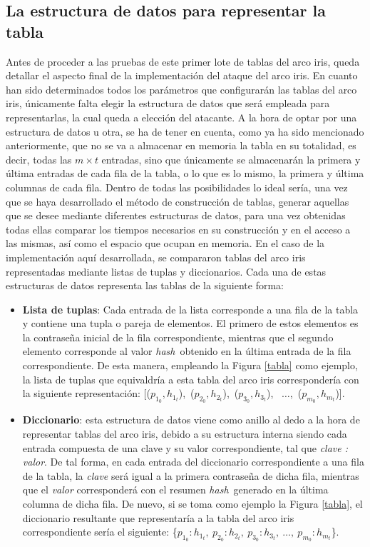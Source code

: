 \documentclass[12pt,spanish,listoffigures,listoftables,listofalgorithms]{tfgetsinf}
\newcommand{\hash}{\textit{hash}}
\begin{document}
\subsection{La estructura de datos para representar la tabla}

Antes de proceder a las pruebas de este primer lote de tablas del arco iris, queda detallar el aspecto final de la implementación del ataque del arco iris. En cuanto han sido determinados todos los parámetros que configurarán las tablas del arco iris, únicamente falta elegir la estructura de datos que será empleada para representarlas, la cual queda a elección del atacante. A la hora de optar por una estructura de datos u otra, se ha de tener en cuenta, como ya ha sido mencionado anteriormente, que no se va a almacenar en memoria la tabla en su totalidad, es decir, todas las $m \times t$ entradas, sino que únicamente se almacenarán la primera y última entradas de cada fila de la tabla, o lo que es lo mismo, la primera y última columnas de cada fila. Dentro de todas las posibilidades lo ideal sería, una vez que se haya desarrollado el método de construcción de tablas, generar aquellas que se desee mediante diferentes estructuras de datos, para una vez obtenidas todas ellas comparar los tiempos necesarios en su construcción y en el acceso a las mismas, así como el espacio que ocupan en memoria. En el caso de la implementación aquí desarrollada, se compararon tablas del arco iris representadas mediante listas de tuplas y diccionarios. Cada una de estas estructuras de datos representa las tablas de la siguiente forma:

\begin{itemize}

    \item \textbf{Lista de tuplas}: Cada entrada de la lista corresponde a una fila de la tabla y contiene una tupla o pareja de elementos. El primero de estos elementos es la contraseña inicial de la fila correspondiente, mientras que el segundo elemento corresponde al valor \hash~obtenido en la última entrada de la fila correspondiente. De esta manera, empleando la Figura \ref{tabla} como ejemplo, la lista de tuplas que equivaldría a esta tabla del arco iris correspondería con la siguiente representación: [($p_{1_0}, h_{1_t}$),~($p_{2_0}, h_{2_t}$),~($p_{3_0}, h_{3_t}$), ~$\dots$,~($p_{m_0}, h_{m_t}$)].
    
    \item \textbf{Diccionario}: esta estructura de datos viene como anillo al dedo a la hora de representar tablas del arco iris, debido a su estructura interna siendo cada entrada compuesta de una clave y su valor correspondiente, tal que \textit{clave : valor}. De tal forma, en cada entrada del diccionario correspondiente a una fila de la tabla, la \textit{clave} será igual a la primera contraseña de dicha fila, mientras que el \textit{valor} corresponderá con el resumen \hash~generado en la última columna de dicha fila. De nuevo, si se toma como ejemplo la Figura \ref{tabla}, el diccionario resultante que representaría a la tabla del arco iris correspondiente sería el siguiente: \{$p_{1_0} : h_{1_t},~p_{2_0} : h_{2_t},~p_{3_0} : h_{3_t}, ~\dots,~p_{m_0} : h_{m_t}$\}.
    
\end{itemize}
\end{document}
